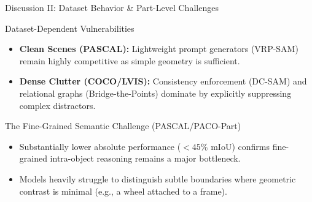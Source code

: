 \documentclass[aspectratio=169, 10pt]{beamer}
\begin{document}
\begin{frame}{Discussion II: Dataset Behavior \& Part-Level Challenges}
    \begin{block}{Dataset-Dependent Vulnerabilities}
        \begin{itemize}
            \item \textbf{Clean Scenes (PASCAL):} Lightweight prompt generators (VRP-SAM) remain highly competitive as simple geometry is sufficient.
            \item \textbf{Dense Clutter (COCO/LVIS):} Consistency enforcement (DC-SAM) and relational graphs (Bridge-the-Points) dominate by explicitly suppressing complex distractors.
        \end{itemize}
    \end{block}
    
    \begin{alertblock}{The Fine-Grained Semantic Challenge (PASCAL/PACO-Part)}
        \begin{itemize}
            \item Substantially lower absolute performance ($<45\%$ mIoU) confirms fine-grained intra-object reasoning remains a major bottleneck.
            \item Models heavily struggle to distinguish subtle boundaries where geometric contrast is minimal (e.g., a wheel attached to a frame).
        \end{itemize}
    \end{alertblock}
\end{frame}
\end{document}
